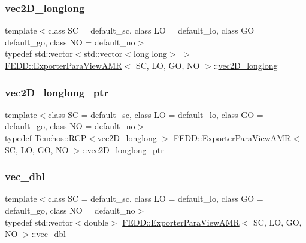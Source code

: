 \subsubsection{\texorpdfstring{vec2\+D\+\_\+longlong}{vec2D\_longlong}}
{\footnotesize\ttfamily template$<$class SC  = default\+\_\+sc, class LO  = default\+\_\+lo, class GO  = default\+\_\+go, class NO  = default\+\_\+no$>$ \\
typedef std\+::vector$<$std\+::vector$<$long long$>$ $>$ \hyperlink{classFEDD_1_1ExporterParaViewAMR}{F\+E\+D\+D\+::\+Exporter\+Para\+View\+A\+MR}$<$ SC, LO, GO, NO $>$\+::\hyperlink{classFEDD_1_1ExporterParaViewAMR_a82b93635433d181e29755ccf170b09c2}{vec2\+D\+\_\+longlong}}

\mbox{\label{classFEDD_1_1ExporterParaViewAMR_aed19e265c08b5c593ba39b5ab0999da4}} 
\subsubsection{\texorpdfstring{vec2\+D\+\_\+longlong\+\_\+ptr}{vec2D\_longlong\_ptr}}
{\footnotesize\ttfamily template$<$class SC  = default\+\_\+sc, class LO  = default\+\_\+lo, class GO  = default\+\_\+go, class NO  = default\+\_\+no$>$ \\
typedef Teuchos\+::\+R\+CP$<$\hyperlink{classFEDD_1_1ExporterParaViewAMR_a82b93635433d181e29755ccf170b09c2}{vec2\+D\+\_\+longlong} $>$ \hyperlink{classFEDD_1_1ExporterParaViewAMR}{F\+E\+D\+D\+::\+Exporter\+Para\+View\+A\+MR}$<$ SC, LO, GO, NO $>$\+::\hyperlink{classFEDD_1_1ExporterParaViewAMR_aed19e265c08b5c593ba39b5ab0999da4}{vec2\+D\+\_\+longlong\+\_\+ptr}}

\mbox{\label{classFEDD_1_1ExporterParaViewAMR_a40cb07542819da8787f6326b973488e1}} 
\subsubsection{\texorpdfstring{vec\+\_\+dbl}{vec\_dbl}}
{\footnotesize\ttfamily template$<$class SC  = default\+\_\+sc, class LO  = default\+\_\+lo, class GO  = default\+\_\+go, class NO  = default\+\_\+no$>$ \\
typedef std\+::vector$<$double$>$ \hyperlink{classFEDD_1_1ExporterParaViewAMR}{F\+E\+D\+D\+::\+Exporter\+Para\+View\+A\+MR}$<$ SC, LO, GO, NO $>$\+::\hyperlink{classFEDD_1_1ExporterParaViewAMR_a40cb07542819da8787f6326b973488e1}{vec\+\_\+dbl}}

